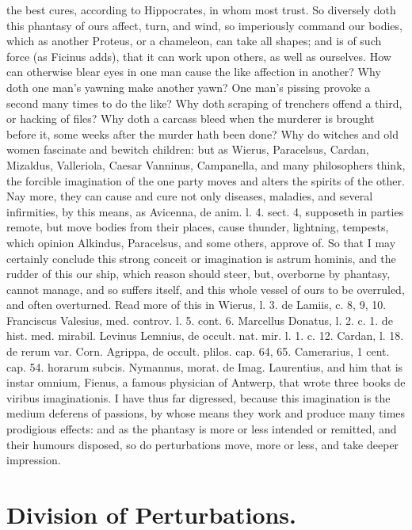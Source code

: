 {the best cures, according to Hippocrates, in whom most trust. So
diversely doth this phantasy of ours affect, turn, and wind, so
imperiously command our bodies, which as another Proteus, or a
chameleon, can take all shapes; and is of such force (as Ficinus adds),
that it can work upon others, as well as ourselves. How can otherwise
blear eyes in one man cause the like affection in another? Why doth one
man's yawning make another yawn? One man's pissing provoke a
second many times to do the like? Why doth scraping of trenchers offend
a third, or hacking of files? Why doth a carcass bleed when the
murderer is brought before it, some weeks after the murder hath been
done? Why do witches and old women fascinate and bewitch children: but
as Wierus, Paracelsus, Cardan, Mizaldus, Valleriola, Caesar Vanninus,
Campanella, and many philosophers think, the forcible imagination of
the one party moves and alters the spirits of the other. Nay more, they
can cause and cure not only diseases, maladies, and several
infirmities, by this means, as Avicenna, de anim. l. 4. sect. 4,
supposeth in parties remote, but move bodies from their places, cause
thunder, lightning, tempests, which opinion Alkindus, Paracelsus, and
some others, approve of. So that I may certainly conclude this strong
conceit or imagination is astrum hominis, and the rudder of this our
ship, which reason should steer, but, overborne by phantasy, cannot
manage, and so suffers itself, and this whole vessel of ours to be
overruled, and often overturned. Read more of this in Wierus, l. 3. de
Lamiis, c. 8, 9, 10. Franciscus Valesius, med. controv. l. 5. cont. 6.
Marcellus Donatus, l. 2. c. 1. de hist. med. mirabil. Levinus Lemnius,
de occult. nat. mir. l. 1. c. 12. Cardan, l. 18. de rerum var. Corn.
Agrippa, de occult. plilos. cap. 64, 65. Camerarius, 1 cent. cap. 54.
horarum subcis. Nymannus, morat. de Imag. Laurentius, and him that is
instar omnium, Fienus, a famous physician of Antwerp, that wrote three
books de viribus imaginationis. I have thus far digressed, because this
imagination is the medium deferens of passions, by whose means they
work and produce many times prodigious effects: and as the phantasy is
more or less intended or remitted, and their humours disposed, so do
perturbations move, more or less, and take deeper impression.

\section{Division of Perturbations.}

}
